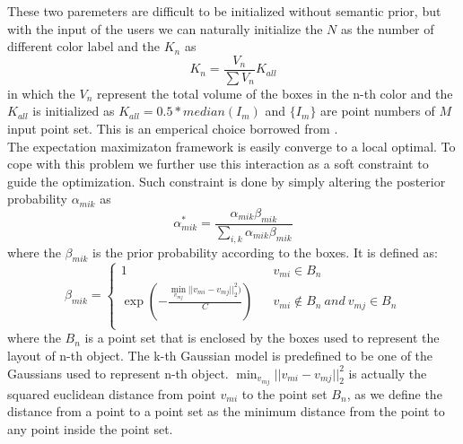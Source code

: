 These two paremeters are difficult to be initialized without semantic prior, but with the input of the users we can naturally initialize the $N$ as the number of different color label and the ${K_n}$ as 
\begin{equation}
K_n=\frac{V_n}{\sum V_n}K_{all}
\end{equation}
in which the $V_n$ represent the total volume of the boxes in the n-th color and the $K_{all}$ is initialized as $K_{all}=0.5*median(I_m)$ and $\{I_m\}$ are point numbers of $M$ input point set. This is an emperical choice borrowed from \cite{Evangelidis2014}.\\
The expectation maximizaton framework is easily converge to a local optimal. To cope with this problem we further use this interaction as a soft constraint to guide the optimization. Such constraint is done by simply altering the posterior probability $\alpha_{mik}$ as\\
\begin{equation}
\alpha_{mik}^*=\frac{\alpha_{mik}\beta_{mik}}{\sum_{i,k}\alpha_{mik}\beta_{mik}}
\end{equation}
where the $\beta_{mik}$ is the prior probability according to the boxes. It is defined as:\\
\begin{equation}
\beta_{mik}=\left\{
\begin{array}{rcl}
1&      & v_{mi} \in B_n\\
\exp(-\frac{\min_{v_{mj}}|| v_{mi} - v_{mj} ||_2^2  )}{C})&      &v_{mi} \notin B_n~and~v_{mj} \in B_n\\
\end{array} \right.
\end{equation}
where the $B_n$ is a point set that is enclosed by the boxes used to represent the layout of n-th object. The k-th Gaussian model is predefined to be one of the Gaussians used to represent n-th object. $\min_{v_{mj}}|| v_{mi} - v_{mj} ||_2^2$ is actually the squared euclidean distance from point $v_{mi}$ to the point set $B_n$, as we define the distance from a point to a point set as the minimum distance from the point to any point inside the point set. 


